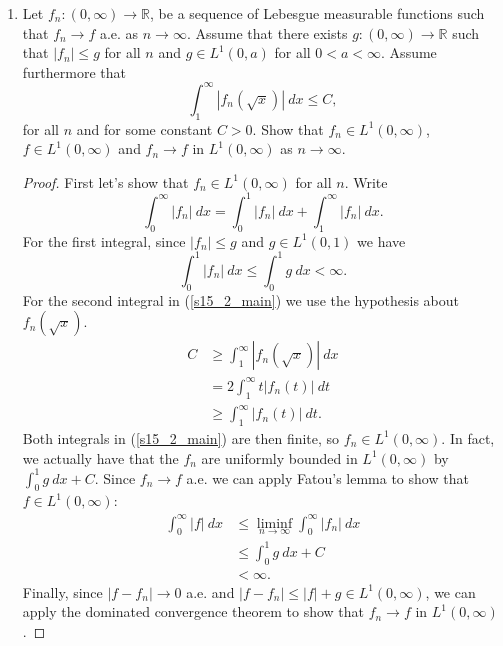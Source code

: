 \documentclass[11pt,letterpaper]{report}
\newcommand{\reals}{\mathbb{R}}
\begin{document}
\begin{enumerate}
	\item Let $f_n: (0, \infty)\to \reals$, be a sequence of Lebesgue measurable functions such that $f_n\to f$ a.e. as $n\to \infty$. Assume that there exists $g: (0, \infty)\to \reals$ such that $|f_n|\leq g$ for all $n$ and $g\in L^1(0, a)$ for all $0<a<\infty$. Assume furthermore that
	\[
	\int_1^\infty |f_n(\sqrt{x})|\ dx\leq C,
	\]
	for all $n$ and for some constant $C>0$. Show that $f_n\in L^1(0, \infty)$, $f\in L^1(0, \infty)$ and $f_n\to f$ in $L^1(0, \infty)$ as $n\to \infty$.
	\begin{proof}
		First let's show that $f_n\in L^1(0, \infty)$ for all $n$. Write
		\begin{equation}\label{s15_2_main}
		\int_0^\infty |f_n|\ dx = \int_0^1|f_n|\ dx + \int_1^\infty |f_n|\ dx.
		\end{equation}
		For the first integral, since $|f_n| \leq g$ and $g\in L^1(0, 1)$ we have
		\[
		\int_0^1|f_n|\ dx \leq \int_0^1 g\ dx <\infty.
		\]
		For the second integral in (\ref{s15_2_main}) we use the hypothesis about $f_n(\sqrt{x})$.
		\begin{align*}
			C &\geq \int_1^\infty |f_n(\sqrt{x})|\ dx\\
			&= 2\int_1^\infty t|f_n(t)|\ dt\\
			&\geq \int_1^\infty |f_n(t)|\ dt.
		\end{align*}
		Both integrals in (\ref{s15_2_main}) are then finite, so $f_n\in L^1(0, \infty)$. In fact, we actually have that the $f_n$ are uniformly bounded in $L^1(0, \infty)$ by $\int_0^1g\ dx + C$. Since $f_n\to f$ a.e. we can apply Fatou's lemma to show that $f\in L^1(0, \infty)$:
		\begin{align*}
			\int_0^\infty |f|\ dx &\leq \liminf_{n\to \infty}\int_0^\infty |f_n|\ dx\\
			&\leq \int_0^1 g\ dx + C\\
			&<\infty.
		\end{align*}
		Finally, since $|f-f_n|\to 0$ a.e. and $|f-f_n| \leq |f| + g\in L^1(0, \infty)$, we can apply the dominated convergence theorem to show that $f_n\to f$ in $L^1(0, \infty)$.
	\end{proof}


\end{enumerate}
\end{document}
